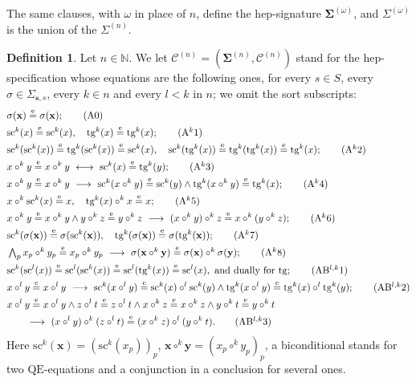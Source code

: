 \documentclass[a4paper,reqno]{amsart}
\newcommand{\sig}[1]{\mathbf{#1}}                %
\newcommand{\spec}[1]{\boldsymbol{\mathcal{#1}}} %
\newcommand{\eeq}{\overset{\mathrm e}{=}}        %
\newcommand{\QE}{\mathrm{QE}}
\newcommand{\src}{\mathrm{sc}}
\newcommand{\tgt}{\mathrm{tg}}
\theoremstyle{plain}
\theoremstyle{definition}
\newtheorem{definition}[theorem]{Definition}
\begin{document}
The same clauses, with $\omega$ in place of $n$, define the hep-signature $\sig{\Sigma}^{(\omega)}$, and $\Sigma^{(\omega)}$ is the union of the $\Sigma^{(n)}$.

\begin{definition}\label{DSpecSingleSet}
Let $n\in\mathbb{N}$.
We let $\spec{C}^{(n)}=(\sig{\Sigma}^{(n)},\mathcal{C}^{(n)})$ stand for the hep-specification whose equations are the following ones, for every $s\in S$, every $\sigma\in\Sigma_{\mathbf{s},s}$, every $k\in n$ and every $l<k$ in $n$; we omit the sort subscripts:
\begin{align*}
&\sigma(\mathbf{x})\eeq\sigma(\mathbf{x});
\tag{A0}\\
&\src^{k}(x)\eeq\src^{k}(x),\quad\tgt^{k}(x)\eeq\tgt^{k}(x);
\tag{A$^{k}$1}\\
&\src^{k}(\src^{k}(x))\eeq\tgt^{k}(\src^{k}(x))\eeq\src^{k}(x),\quad\src^{k}(\tgt^{k}(x))\eeq\tgt^{k}(\tgt^{k}(x))\eeq\tgt^{k}(x);
\tag{A$^{k}$2}\\
&x\circ^{k}y\eeq x\circ^{k}y\ \longleftrightarrow\ \src^{k}(x)\eeq\tgt^{k}(y);
\tag{A$^{k}$3}\\
&x\circ^{k}y\eeq x\circ^{k}y\ \longrightarrow\ \src^{k}(x\circ^{k}y)\eeq\src^{k}(y)\wedge\tgt^{k}(x\circ^{k}y)\eeq\tgt^{k}(x);
\tag{A$^{k}$4}\\
&x\circ^{k}\src^{k}(x)\eeq x,\quad\tgt^{k}(x)\circ^{k}x\eeq x;
\tag{A$^{k}$5}\\
&x\circ^{k}y\eeq x\circ^{k}y\wedge y\circ^{k}z\eeq y\circ^{k}z\ \longrightarrow\ (x\circ^{k}y)\circ^{k}z\eeq x\circ^{k}(y\circ^{k}z);
\tag{A$^{k}$6}\\
&\src^{k}(\sigma(\mathbf{x}))\eeq\sigma(\src^{k}(\mathbf{x})),\quad\tgt^{k}(\sigma(\mathbf{x}))\eeq\sigma(\tgt^{k}(\mathbf{x}));
\tag{A$^{k}$7}\\
&\textstyle\bigwedge_{p}x_{p}\circ^{k}y_{p}\eeq x_{p}\circ^{k}y_{p}\ \longrightarrow\ \sigma(\mathbf{x}\circ^{k}\mathbf{y})\eeq\sigma(\mathbf{x})\circ^{k}\sigma(\mathbf{y});
\tag{A$^{k}$8}\\
&\src^{k}(\src^{l}(x))\eeq\src^{l}(\src^{k}(x))\eeq\src^{l}(\tgt^{k}(x))\eeq\src^{l}(x),\ \text{and dually for $\tgt$};
\tag{AB$^{l,k}$1}\\
&x\circ^{l}y\eeq x\circ^{l}y\ \longrightarrow\ \src^{k}(x\circ^{l}y)\eeq\src^{k}(x)\circ^{l}\src^{k}(y)\wedge\tgt^{k}(x\circ^{l}y)\eeq\tgt^{k}(x)\circ^{l}\tgt^{k}(y);
\tag{AB$^{l,k}$2}\\
&x\circ^{l}y\eeq x\circ^{l}y\wedge z\circ^{l}t\eeq z\circ^{l}t\wedge x\circ^{k}z\eeq x\circ^{k}z\wedge y\circ^{k}t\eeq y\circ^{k}t
\\&\qquad\longrightarrow\ (x\circ^{l}y)\circ^{k}(z\circ^{l}t)\eeq(x\circ^{k}z)\circ^{l}(y\circ^{k}t).
\tag{AB$^{l,k}$3}
\end{align*}
Here $\src^{k}(\mathbf{x})=(\src^{k}(x_{p}))_{p}$, $\mathbf{x}\circ^{k}\mathbf{y}=(x_{p}\circ^{k}y_{p})_{p}$, a biconditional stands for two $\QE$-equations and a conjunction in a conclusion for several ones.
\end{definition}
\end{document}
